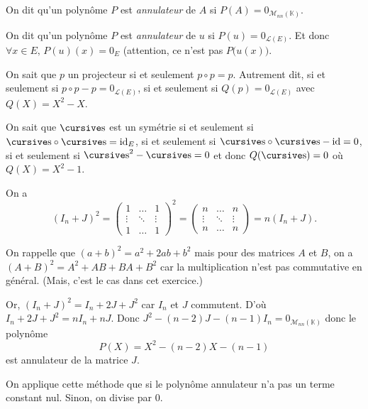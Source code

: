 \begin{defn}
	On dit qu'un polynôme $P$\/ est {\it annulateur}\/ de $A$\/ si $P(A) = 0_{\mathscr{M}_{nn}(\mathds{K})}$.

	\noindent On dit qu'un polynôme $P$\/ est {\it annulateur}\/ de $u$\/ si $P(u) = 0_{\mathscr{L}(E)}$. Et donc $\forall x \in E,\,P(u)(x) = 0_E$\/ (attention, ce n'est pas $P\big(u(x)\big)$.
\end{defn}

\begin{exm}
	On sait que $p$\/ un projecteur si et seulement $p \circ p = p$.
	Autrement dit, si et seulement si $p  \circ p - p = 0_{\mathscr{L}(E)}$, si et seulement si $Q(p) = 0_{\mathscr{L}(E)}$\/ avec $Q(X) = X^2 - X$.

	\noindent
	On sait que $\s$\/ est un symétrie si et seulement si $\s\circ\s = \id_E$, si et seulement si $\s \circ \s - \id = 0$, si et seulement si $\s^2 - \s = 0$\/ et donc $Q(\s) = 0$\/ où $Q(X) = X^2 - 1$.
\end{exm}

\begin{exo}
	On a \[
		(I_n + J)^2 = \begin{pmatrix}
			1 & \ldots & 1\\
			\vdots& \ddots &\vdots\\
			1&\ldots&1
		\end{pmatrix}^2 = \begin{pmatrix}
			n & \ldots & n\\
			\vdots& \ddots &\vdots\\
			n&\ldots&n
		\end{pmatrix} = n (I_n + J)
	.\]

	On rappelle que $(a+b)^2 = a^2 + 2ab + b^2$\/ mais pour des matrices $A$\/ et $B$, on a $(A+B)^2 = A^2 + AB + BA + B^2$ car la multiplication n'est pas commutative en général. (Mais, c'est le cas dans cet exercice.)

	Or, $(I_n + J)^2 = I_n + 2J + J^2$\/ car $I_n$\/ et $J$\/ commutent.
	D'où $I_n + 2J + J^2 = nI_n + nJ$. Donc $J^2 - (n-2)J - (n-1)I_n = 0_{\mathscr{M}_{nn}(\mathds{K})}$\/ donc le polynôme \[
		P(X) = X^2 - (n-2)X - (n-1)
	\] est annulateur de la matrice $J$.
\end{exo}

\begin{met}
	On applique cette méthode que si le polynôme annulateur n'a pas un terme constant nul. Sinon, on divise par $0$.
\end{met}

